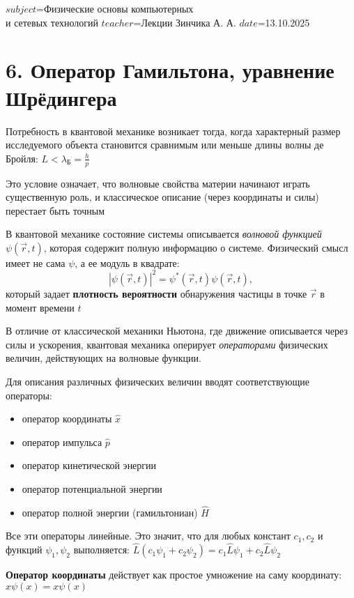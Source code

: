 $subject$=Физические основы компьютерных \\ и сетевых технологий
$teacher$=Лекции Зинчика А. А.
$date$=13.10.2025

\section{6. Оператор Гамильтона, уравнение Шрёдингера}

Потребность в квантовой механике возникает тогда, когда характерный размер исследуемого объекта становится сравнимым или меньше длины волны де Бройля: $L < \lambda_{\text{Б}} = \frac{h}{p}$

Это условие означает, что волновые свойства материи начинают играть существенную роль, и классическое описание (через координаты и силы) перестает быть точным

\mediumvspace

В квантовой механике состояние системы описывается \textit{волновой функцией} $\psi(\vec r, t)$, которая содержит полную информацию о системе.  
Физический смысл имеет не сама $\psi$, а ее модуль в квадрате:
\[
|\psi(\vec r, t)|^2 = \psi^*(\vec r, t)\psi(\vec r, t),
\]
который задает \textbf{плотность вероятности} обнаружения частицы в точке $\vec r$ в момент времени $t$

\mediumvspace

В отличие от классической механики Ньютона, где движение описывается через силы и ускорения, квантовая механика оперирует \textit{операторами} физических величин, действующих на волновые функции.  

Для описания различных физических величин вводят соответствующие операторы:

\begin{itemize}
    \item оператор координаты $\hat{x}$
    \item оператор импульса $\hat{p}$
    \item оператор кинетической энергии
    \item оператор потенциальной энергии
    \item оператор полной энергии (гамильтониан) $\hat{H}$
\end{itemize}

Все эти операторы линейные. Это значит, что для любых констант $c_1, c_2$ и функций $\psi_1, \psi_2$ выполняется: $\hat{L}(c_1 \psi_1 + c_2 \psi_2) = c_1 \hat{L}\psi_1 + c_2 \hat{L}\psi_2$


\textbf{Оператор координаты} действует как простое умножение на саму координату: $\hat{x}\psi(x) = x\psi(x)$

